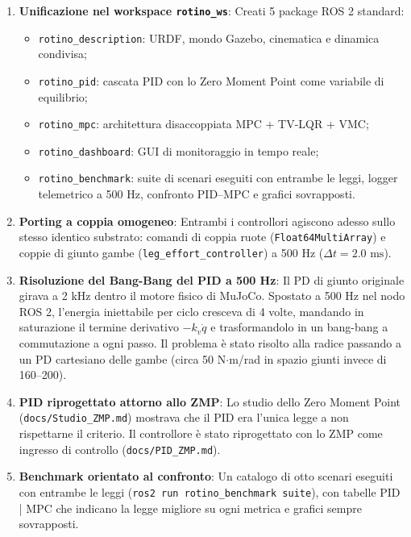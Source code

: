 \documentclass[11pt,a4paper]{article}
\begin{document}
\begin{enumerate}
    \item \textbf{Unificazione nel workspace \texttt{rotino\_ws}}: 
    Creati 5 package ROS 2 standard:
    \begin{itemize}
        \item \texttt{rotino\_description}: URDF, mondo Gazebo, cinematica e dinamica condivisa;
        \item \texttt{rotino\_pid}: cascata PID con lo Zero Moment Point come variabile di equilibrio;
        \item \texttt{rotino\_mpc}: architettura disaccoppiata MPC + TV-LQR + VMC;
        \item \texttt{rotino\_dashboard}: GUI di monitoraggio in tempo reale;
        \item \texttt{rotino\_benchmark}: suite di scenari eseguiti con entrambe le leggi, logger telemetrico a 500 Hz, confronto PID--MPC e grafici sovrapposti.
    \end{itemize}
    
    \item \textbf{Porting a coppia omogeneo}:
    Entrambi i controllori agiscono adesso sullo stesso identico substrato: comandi di coppia ruote (\texttt{Float64MultiArray}) e coppie di giunto gambe (\texttt{leg\_effort\_controller}) a 500 Hz ($\Delta t = 2.0\text{ ms}$).
    
    \item \textbf{Risoluzione del Bang-Bang del PID a 500 Hz}:
    Il PD di giunto originale girava a 2 kHz dentro il motore fisico di MuJoCo. Spostato a 500 Hz nel nodo ROS 2, l'energia iniettabile per ciclo cresceva di 4 volte, mandando in saturazione il termine derivativo $-k_v \dot{q}$ e trasformandolo in un bang-bang a commutazione a ogni passo. Il problema è stato risolto alla radice passando a un PD cartesiano delle gambe (circa 50 N$\cdot$m/rad in spazio giunti invece di 160--200).

    \item \textbf{PID riprogettato attorno allo ZMP}:
    Lo studio dello Zero Moment Point (\texttt{docs/Studio\_ZMP.md}) mostrava che il PID era l'unica legge a non rispettarne il criterio. Il controllore è stato riprogettato con lo ZMP come ingresso di controllo (\texttt{docs/PID\_ZMP.md}).

    \item \textbf{Benchmark orientato al confronto}:
    Un catalogo di otto scenari eseguiti con entrambe le leggi (\texttt{ros2 run rotino\_benchmark suite}), con tabelle PID | MPC che indicano la legge migliore su ogni metrica e grafici sempre sovrapposti.
\end{enumerate}
\end{document}

